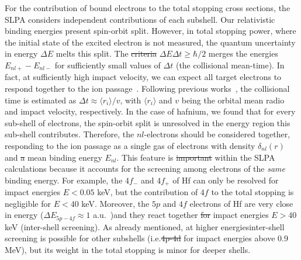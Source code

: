 \documentclass[aps,pra,reprint,superscriptaddress]{revtex4-1}
\providecommand{\DIFadd}[1]{{\protect\color{blue}\uwave{#1}}} %
\providecommand{\DIFdel}[1]{{\protect\color{red}\sout{#1}}}                      %
\providecommand{\DIFaddbegin}{} %
\providecommand{\DIFaddend}{} %
\providecommand{\DIFdelbegin}{} %
\providecommand{\DIFdelend}{} %
\newcommand{\DIFscaledelfig}{0.5}
\newlength{\DIFdelgraphicswidth} %
\newlength{\DIFdelgraphicsheight} %
\newcommand{\DIFaddincludegraphics}[2][]{{\color{blue}\fbox{\DIFOincludegraphics[#1]{#2}}}} %
\newcommand{\DIFdelincludegraphics}[2][]{%
\sbox{\DIFdelgraphicsbox}{\DIFOincludegraphics[#1]{#2}}%
\settoboxwidth{\DIFdelgraphicswidth}{\DIFdelgraphicsbox} %
\settoboxtotalheight{\DIFdelgraphicsheight}{\DIFdelgraphicsbox} %
\scalebox{\DIFscaledelfig}{%
\parbox[b]{\DIFdelgraphicswidth}{\usebox{\DIFdelgraphicsbox}\\[-\baselineskip] \rule{\DIFdelgraphicswidth}{0em}}\llap{\resizebox{\DIFdelgraphicswidth}{\DIFdelgraphicsheight}{%
\setlength{\unitlength}{\DIFdelgraphicswidth}%
\begin{picture}(1,1)%
\thicklines\linethickness{2pt} %
{\color[rgb]{1,0,0}\put(0,0){\framebox(1,1){}}}%
{\color[rgb]{1,0,0}\put(0,0){\line( 1,1){1}}}%
{\color[rgb]{1,0,0}\put(0,1){\line(1,-1){1}}}%
\end{picture}%
}\hspace*{3pt}}} %
} %
\DeclareRobustCommand{\DIFaddbegin}{\DIFOaddbegin \let\includegraphics\DIFaddincludegraphics} %
\DeclareRobustCommand{\DIFaddend}{\DIFOaddend \let\includegraphics\DIFOincludegraphics} %
\DeclareRobustCommand{\DIFdelbegin}{\DIFOdelbegin \let\includegraphics\DIFdelincludegraphics} %
\DeclareRobustCommand{\DIFdelend}{\DIFOaddend \let\includegraphics\DIFOincludegraphics} %
\begin{document}
For the contribution of bound electrons to the total stopping cross 
sections, the SLPA considers independent contributions of each subshell. 
Our relativistic binding energies present spin-orbit split. However, 
in total stopping power, where the initial state of the excited electron 
is not measured, the quantum uncertainty in energy $\Delta E$ melts this 
split. The \DIFdelbegin \DIFdel{criteria }\DIFdelend \DIFaddbegin \DIFadd{criterion }\DIFaddend $\Delta E\Delta t\geq\hbar/2$ merges the energies 
$E_{nl+}-E_{nl-}$ for sufficiently small values of $\Delta t$ (the 
collisional mean-time). In fact, at sufficiently high impact velocity, 
we can expect all target electrons to respond together to the ion 
passage~\cite{lindhard53,chu72}. Following previous works~\cite{mon09},
the collisional time is estimated as $\Delta t\approx\langle r_i\rangle/v$, 
with $\langle r_i\rangle$ and $v$ being the orbital mean radio and 
impact velocity, respectively. In the case of hafnium, we found that for 
every sub-shell of electrons, the spin-orbit split is unresolved in the 
energy region this sub-shell contributes. Therefore, the $nl$-electrons 
should be considered together, responding to the ion passage as a single 
gas of electrons with density $\delta_{nl}(r)$ and \DIFdelbegin \DIFdel{a }\DIFdelend mean binding energy 
$E_{nl}$. This feature is \DIFdelbegin \DIFdel{important }\DIFdelend \DIFaddbegin \DIFadd{vital }\DIFaddend within the SLPA calculations because 
it accounts for the screening among electrons of the \textit{same} 
binding energy. For example, the $4f_{-}$ and $4f_{+}$ of Hf can only 
be resolved for impact energies $E<0.05$ keV, but the contribution of 
$4f$ to the total stopping is negligible for $E<40$ keV. Moreover, the 
$5p$ and $4f$ electrons of Hf are very close in energy 
($\Delta E_{5p-4f} \approx 1$ a.u.~\cite{mendez2019})\DIFaddbegin \DIFadd{, }\DIFaddend and they react 
together \DIFdelbegin \DIFdel{for }\DIFdelend \DIFaddbegin \DIFadd{at }\DIFaddend impact energies $E>40$ keV (inter-shell screening). As 
already mentioned, at higher energies\DIFaddbegin \DIFadd{, }\DIFaddend inter-shell screening is possible 
for other subshells (i.e.\DIFdelbegin \DIFdel{4p-4d }\DIFdelend \DIFaddbegin \DIFadd{, $4p$-$4d$ }\DIFaddend for impact energies above 0.9 MeV), 
but its weight in the total stopping is minor for deeper shells.
\end{document}
